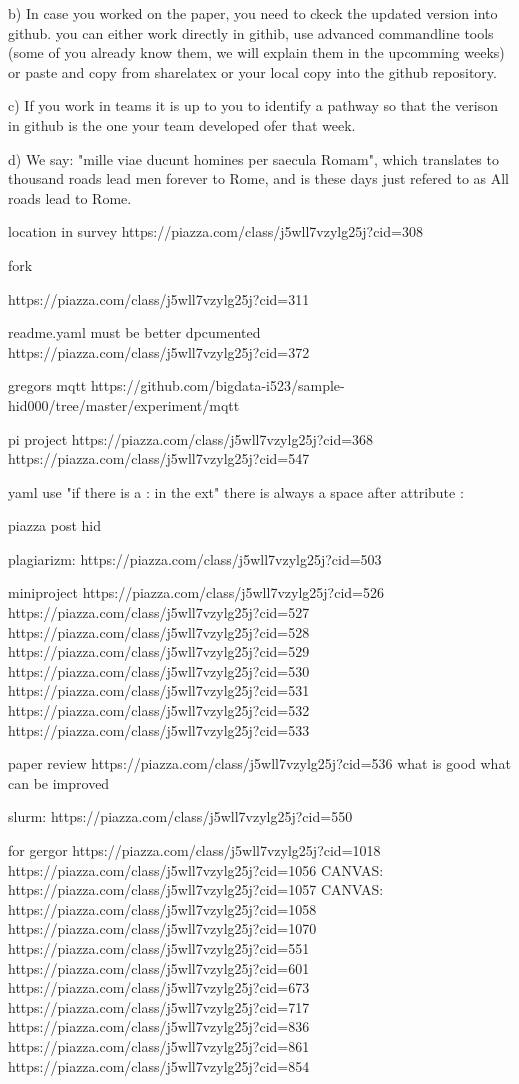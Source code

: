  

b) In case you worked on the paper, you need to ckeck the updated version into github. you can either work directly in githib, use advanced commandline tools (some of you already know them, we will explain them in the upcomming weeks) or paste and copy from sharelatex or your local copy into the github repository.

 

c) If you work in teams it is up to you to identify a pathway so that the verison in github is the one your team developed ofer that week.

 

d) We say: "mille viae ducunt homines per saecula Romam", which translates to thousand roads lead men forever to Rome, and is these days just refered to as  All roads lead to Rome.

location in survey
https://piazza.com/class/j5wll7vzylg25j?cid=308


fork

https://piazza.com/class/j5wll7vzylg25j?cid=311

readme.yaml must be better dpcumented
https://piazza.com/class/j5wll7vzylg25j?cid=372

gregors mqtt
https://github.com/bigdata-i523/sample-hid000/tree/master/experiment/mqtt

pi project
https://piazza.com/class/j5wll7vzylg25j?cid=368
https://piazza.com/class/j5wll7vzylg25j?cid=547

yaml
use "if there is a : in the ext"
there is always a space after attribute :

piazza post hid 

plagiarizm: https://piazza.com/class/j5wll7vzylg25j?cid=503

miniproject
https://piazza.com/class/j5wll7vzylg25j?cid=526
https://piazza.com/class/j5wll7vzylg25j?cid=527
https://piazza.com/class/j5wll7vzylg25j?cid=528
https://piazza.com/class/j5wll7vzylg25j?cid=529
https://piazza.com/class/j5wll7vzylg25j?cid=530
https://piazza.com/class/j5wll7vzylg25j?cid=531
https://piazza.com/class/j5wll7vzylg25j?cid=532
https://piazza.com/class/j5wll7vzylg25j?cid=533

paper review
https://piazza.com/class/j5wll7vzylg25j?cid=536
what is good
what can be improved

slurm: https://piazza.com/class/j5wll7vzylg25j?cid=550

for gergor
https://piazza.com/class/j5wll7vzylg25j?cid=1018
https://piazza.com/class/j5wll7vzylg25j?cid=1056
CANVAS: https://piazza.com/class/j5wll7vzylg25j?cid=1057
CANVAS: https://piazza.com/class/j5wll7vzylg25j?cid=1058
https://piazza.com/class/j5wll7vzylg25j?cid=1070
https://piazza.com/class/j5wll7vzylg25j?cid=551
https://piazza.com/class/j5wll7vzylg25j?cid=601
https://piazza.com/class/j5wll7vzylg25j?cid=673
https://piazza.com/class/j5wll7vzylg25j?cid=717
https://piazza.com/class/j5wll7vzylg25j?cid=836
https://piazza.com/class/j5wll7vzylg25j?cid=861
https://piazza.com/class/j5wll7vzylg25j?cid=854


